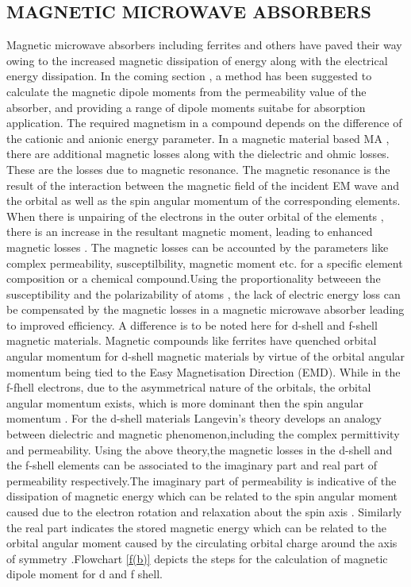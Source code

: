 \documentclass[journal]{IEEEtran}
\begin{document}
\subsection{MAGNETIC MICROWAVE ABSORBERS}
Magnetic microwave absorbers including ferrites and others have paved their way owing to the increased magnetic dissipation of energy along with the electrical energy dissipation\cite{HexaF}. In the coming section , a method has been suggested to calculate the magnetic dipole moments from the permeability value of the absorber, and providing a range of dipole moments suitabe for absorption application. The required magnetism in a compound depends on the difference of the cationic and anionic energy parameter. 
In a magnetic material based MA , there are additional magnetic losses along with the dielectric and ohmic losses. These are the losses due to magnetic resonance. The magnetic resonance is the result of the interaction between the magnetic field of the incident EM wave and the orbital as well as the spin angular momentum of the corresponding elements\cite{Ferrite}. When there is unpairing of the electrons in the outer orbital of the elements , there is an increase in the resultant magnetic moment, leading to enhanced magnetic losses\cite{HexaF} \cite{LaMn}. The magnetic losses can be accounted by the parameters like complex  permeability, susceptilbility, magnetic moment etc. for a specific element composition or a chemical compound.Using the proportionality betweeen the susceptibility and the polarizability of atoms \cite{patil1985susceptibility}, the lack of electric energy loss can be compensated by the magnetic losses in a magnetic microwave absorber leading to improved efficiency.
A difference is to be noted here for d-shell and f-shell magnetic materials.  Magnetic compounds like ferrites have quenched orbital angular momentum for d-shell magnetic materials by virtue of the  orbital angular momentum being tied to the Easy Magnetisation Direction (EMD). While in the f-fhell electrons, due to the asymmetrical nature of the orbitals, the orbital angular momentum exists, which is more dominant then the spin angular momentum \cite{mchenry2002magnetic}.
For the d-shell materials
Langevin's theory develops an analogy between dielectric and magnetic phenomenon,including the complex permittivity and permeability. Using the above theory,the magnetic losses in the d-shell and the f-shell elements can be associated to the imaginary part and real part of permeability respectively.The imaginary part of permeability is indicative of the dissipation of magnetic energy which  can be related to the spin angular moment caused due to the electron rotation and relaxation about the spin axis . Similarly the real part indicates the stored magnetic energy which can be related to the orbital angular moment caused by the  circulating orbital charge around the axis of symmetry  .Flowchart \ref{f(b)} depicts the steps for the calculation of magnetic dipole moment for d and f shell.
\end{document}
